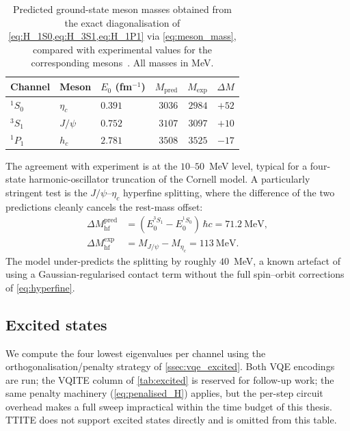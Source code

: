 \begin{table}[htbp]
\centering
\caption{Predicted ground-state meson masses obtained from the exact
  diagonalisation of \cref{eq:H_1S0,eq:H_3S1,eq:H_1P1} via
  \cref{eq:meson_mass}, compared with experimental values for the
  corresponding mesons~\cite{pdg2024}. All masses in MeV.}
\label{tab:meson_masses}
\renewcommand{\arraystretch}{1.15}
\begin{tabular}{lllrrr}
\toprule
Channel & Meson & $E_0$ (fm$^{-1}$) & $M_{\mathrm{pred}}$
        & $M_{\mathrm{exp}}$ & $\Delta M$ \\
\midrule
${}^1S_0$ & $\eta_c$ & $0.391$ & $3036$ & $2984$ & $+52$ \\
${}^3S_1$ & $J/\psi$ & $0.752$ & $3107$ & $3097$ & $+10$ \\
${}^1P_1$ & $h_c$    & $2.781$ & $3508$ & $3525$ & $-17$ \\
\bottomrule
\end{tabular}
\end{table}

The agreement with experiment is at the $10$--$50$~MeV level, typical
for a four-state harmonic-oscillator truncation of the Cornell model.
A particularly stringent test is the
$J/\psi$--$\eta_c$ hyperfine splitting, where the difference of the
two predictions cleanly cancels the rest-mass offset:
\begin{align*}
  \Delta M_{\mathrm{hf}}^{\mathrm{pred}}
    &= (E_0^{{}^3S_1} - E_0^{{}^1S_0})\,\hbar c
    = 71.2~\mathrm{MeV},\\
  \Delta M_{\mathrm{hf}}^{\mathrm{exp}}
    &= M_{J/\psi} - M_{\eta_c}
    = 113~\mathrm{MeV}.
\end{align*}
The model under-predicts the splitting by roughly $40$~MeV, a known
artefact of using a Gaussian-regularised contact term without the full
spin--orbit corrections of \cref{eq:hyperfine}.

\subsection{Excited states}
\label{ssec:excited}

We compute the four lowest eigenvalues per channel using the
orthogonalisation/penalty strategy of \cref{ssec:vqe_excited}. Both
VQE encodings are run; the VQITE column of \cref{tab:excited} is
reserved for follow-up work; the same penalty machinery
(\cref{eq:penalised_H}) applies, but the per-step circuit overhead
makes a full sweep impractical within the time budget of this thesis.
TTITE does not support excited states directly and is omitted from
this table.

